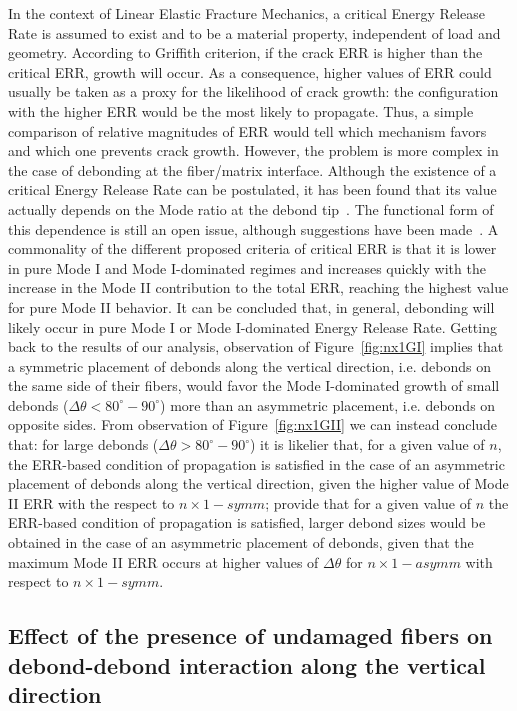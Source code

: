 \documentclass[smallextended]{svjour3}       %
\begin{document}
In the context of Linear Elastic Fracture Mechanics, a critical Energy Release Rate is assumed to exist and to be a material property, independent of load and geometry. According to Griffith criterion, if the crack ERR is higher than the critical ERR, growth will occur. As a consequence, higher values of ERR could usually be taken as a proxy for the likelihood of crack growth: the configuration with the higher ERR would be the most likely to propagate. Thus, a simple comparison of relative magnitudes of ERR would tell which mechanism favors and which one prevents crack growth. However, the problem is more complex in the case of debonding at the fiber/matrix interface. Although the existence of a critical Energy Release Rate can be postulated, it has been found that its value actually depends on the Mode ratio at the debond tip~\cite{Hutchinson1991}. The functional form of this dependence is still an open issue, although suggestions have been made~\cite{Hutchinson1991,Mantic2009}. A commonality of the different proposed criteria of critical ERR is that it is lower in pure Mode I and Mode I-dominated regimes and increases quickly with the increase in the Mode II contribution to the total ERR, reaching the highest value for pure Mode II behavior. It can be concluded that, in general, debonding will likely occur in pure Mode I or Mode I-dominated Energy Release Rate. Getting back to the results of our analysis, observation of Figure~\ref{fig:nx1GI} implies that a symmetric placement of debonds along the vertical direction, i.e. debonds on the same side of their fibers, would favor the Mode I-dominated growth of small debonds ($\Delta\theta<80^{\circ}-90^{\circ}$) more than an asymmetric placement, i.e. debonds on opposite sides. From observation of Figure~\ref{fig:nx1GII} we can instead conclude that: for large debonds ($\Delta\theta>80^{\circ}-90^{\circ}$) it is likelier that, for a given value of $n$, the ERR-based condition of propagation is satisfied in the case of an asymmetric placement of debonds along the vertical direction, given the higher value of Mode II ERR with the respect to $n\times 1-symm$; provide that for a given value of $n$ the ERR-based condition of propagation is satisfied, larger debond sizes would be obtained in the case of an asymmetric placement of debonds, given that the maximum Mode II ERR occurs at higher values of $\Delta\theta$ for $n\times 1-asymm$ with respect to $n\times 1-symm$.

\subsection{Effect of the presence of undamaged fibers on debond-debond interaction along the vertical direction}\label{subsec:fibersinbetween}
\end{document}
